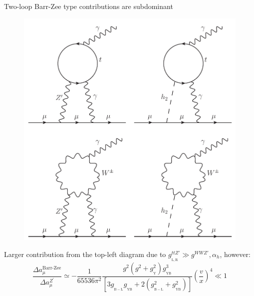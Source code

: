 \documentclass[10pt,xcolor=dvipsnames,mathserif]{beamer}
\newcommand{\g}[2]{g_{_\mathrm{#1}}^{#2}}
\begin{document}
\begin{frame}
Two-loop Barr-Zee type contributions are subdominant
\begin{figure}[!h]
	\includegraphics[scale=0.32]{Images/BLSM_2/Barr-Zee.pdf}
\end{figure}	
Larger contribution	from the top-left diagram due to $\g{L,R}{ttZ'} \gg \g{}{WWZ'}, \alpha_h$, however:
\begin{equation*}
\dfrac{\Delta a_\mu^{\text{Barr-Zee}}}{\Delta a_\mu^{Z^\prime}} \simeq -\dfrac{1}{65536 \pi^2}\dfrac{g^2 \left(g^2 + \g{Y}{2}\right) \g{YB}{3}}{\left[3 \g{B-L}{} \g{YB}{}  + 2\left(\g{B-L}{2} + \g{YB}{2} \right) \right] } \left(\dfrac{v}{x}\right)^4 \ll 1 
\end{equation*}

\end{frame}
\end{document}
